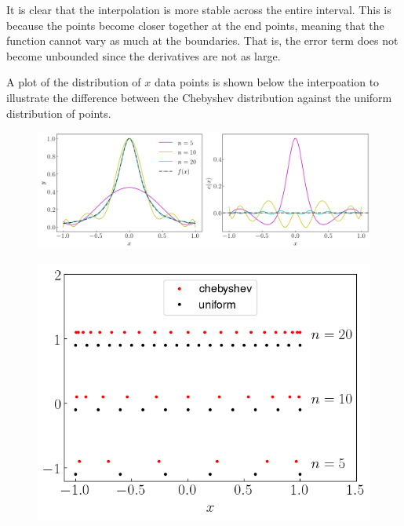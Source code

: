 \documentclass[12pt,a4paper]{article}
\begin{document}
It is clear that the interpolation is more stable across the entire interval.
This is because the points become closer together at the end points, meaning that the function cannot vary as much at the boundaries.
That is, the error term does not become unbounded since the derivatives are not as large.

A plot of the distribution of $x$ data points is shown below the interpoation to illustrate the difference between the Chebyshev distribution against the uniform distribution of points.

\begin{figure}[H]
    \begin{center}
        \includegraphics[scale=0.45]{./fig2.png} 
    \end{center}
\end{figure}

\begin{figure}[H]
    \begin{center}
        \includegraphics[scale=0.75]{./fig3.png} 
    \end{center}
\end{figure}
\end{document}
